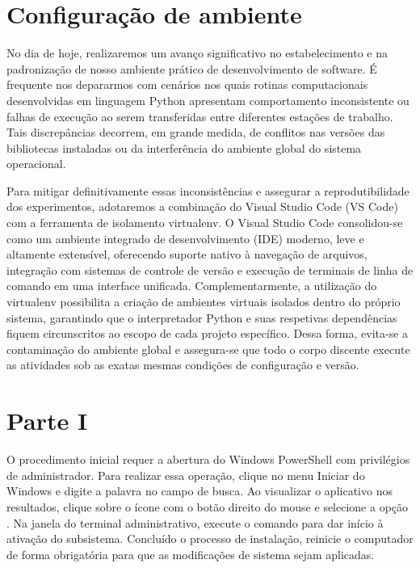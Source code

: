 

\section*{Configuração de ambiente}

No dia de hoje, realizaremos um avanço significativo no estabelecimento e na padronização de nosso ambiente prático de desenvolvimento de software. É frequente nos depararmos com cenários nos quais rotinas computacionais desenvolvidas em linguagem Python apresentam comportamento inconsistente ou falhas de execução ao serem transferidas entre diferentes estações de trabalho. Tais discrepâncias decorrem, em grande medida, de conflitos nas versões das bibliotecas instaladas ou da interferência do ambiente global do sistema operacional.

Para mitigar definitivamente essas inconsistências e assegurar a reprodutibilidade dos experimentos, adotaremos a combinação do Visual Studio Code (VS Code) com a ferramenta de isolamento virtualenv. O Visual Studio Code consolidou-se como um ambiente integrado de desenvolvimento (IDE) moderno, leve e altamente extensível, oferecendo suporte nativo à navegação de arquivos, integração com sistemas de controle de versão e execução de terminais de linha de comando em uma interface unificada.
Complementarmente, a utilização do virtualenv possibilita a criação de ambientes virtuais isolados dentro do próprio sistema, garantindo que o interpretador Python e suas respetivas dependências fiquem circunscritos ao escopo de cada projeto específico. Dessa forma, evita-se a contaminação do ambiente global e assegura-se que todo o corpo discente execute as atividades sob as exatas mesmas condições de configuração e versão.

\section*{Parte I}

O procedimento inicial requer a abertura do Windows PowerShell com privilégios de administrador. Para realizar essa operação, clique no menu Iniciar do Windows e digite a palavra  no campo de busca. Ao visualizar o aplicativo nos resultados, clique sobre o ícone com o botão direito do mouse e selecione a opção . Na janela do terminal administrativo, execute o comando  para dar início à ativação do subsistema. Concluído o processo de instalação, reinicie o computador de forma obrigatória para que as modificações de sistema sejam aplicadas.

